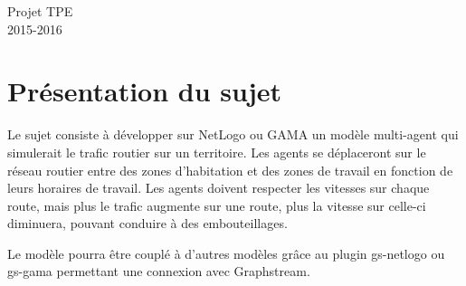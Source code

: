 \documentclass[a4paper,11pt]{article}
\begin{document}
\begin{center}
\Large{Projet TPE\\2015-2016\\}
\end{center}

\section{Présentation du sujet}

Le sujet consiste à développer sur NetLogo ou GAMA un modèle multi-agent qui simulerait le trafic routier sur un territoire. Les agents se déplaceront sur le réseau routier entre des zones d'habitation et des zones de travail en fonction de leurs horaires de travail. Les agents doivent respecter les vitesses sur chaque route, mais plus le trafic augmente sur une route, plus la vitesse sur celle-ci diminuera, pouvant conduire à des embouteillages.

Le modèle pourra être couplé à d'autres modèles grâce au plugin gs-netlogo ou gs-gama permettant une connexion avec Graphstream.
\end{document}
